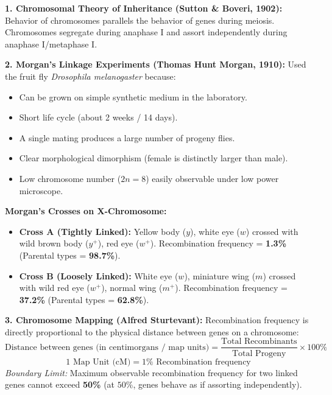 \documentclass[10pt,a4paper]{article}
\begin{document}
\begin{formulabox}
\textbf{1. Chromosomal Theory of Inheritance (Sutton \& Boveri, 1902):}
Behavior of chromosomes parallels the behavior of genes during meiosis. Chromosomes segregate during anaphase I and assort independently during anaphase I/metaphase I.

\textbf{2. Morgan's Linkage Experiments (Thomas Hunt Morgan, 1910):}
Used the fruit fly \textit{Drosophila melanogaster} because:
\begin{itemize}
  \item Can be grown on simple synthetic medium in the laboratory.
  \item Short life cycle (about 2 weeks / 14 days).
  \item A single mating produces a large number of progeny flies.
  \item Clear morphological dimorphism (female is distinctly larger than male).
  \item Low chromosome number ($2n = 8$) easily observable under low power microscope.
\end{itemize}
\textbf{Morgan's Crosses on X-Chromosome:}
\begin{itemize}
  \item \textbf{Cross A (Tightly Linked):} Yellow body ($y$), white eye ($w$) crossed with wild brown body ($y^+$), red eye ($w^+$). Recombination frequency = \textbf{1.3\%} (Parental types = \textbf{98.7\%}).
  \item \textbf{Cross B (Loosely Linked):} White eye ($w$), miniature wing ($m$) crossed with wild red eye ($w^+$), normal wing ($m^+$). Recombination frequency = \textbf{37.2\%} (Parental types = \textbf{62.8\%}).
\end{itemize}
\textbf{3. Chromosome Mapping (Alfred Sturtevant):}
Recombination frequency is directly proportional to the physical distance between genes on a chromosome:
\begin{equation}
  \text{Distance between genes (in centimorgans / map units)} = \frac{\text{Total Recombinants}}{\text{Total Progeny}} \times 100\%
\end{equation}
\begin{equation}
  1\text{ Map Unit (cM)} = 1\% \text{ Recombination frequency}
\end{equation}
\textit{Boundary Limit:} Maximum observable recombination frequency for two linked genes cannot exceed \textbf{50\%} (at $50\%$, genes behave as if assorting independently).
\end{formulabox}
\end{document}
